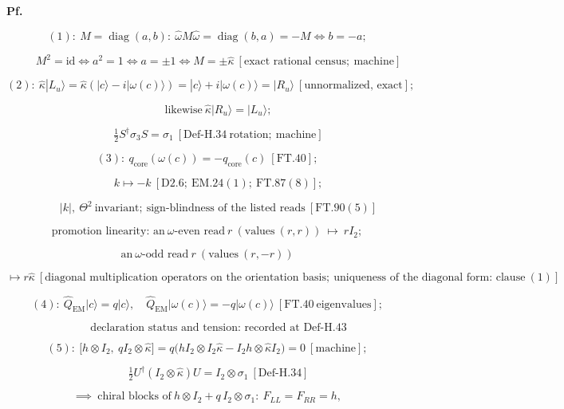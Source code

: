 \begin{theorem}
\textbf{Pf.}

\[
(1):\ M=\operatorname{diag}(a,b):\ \hat\omega M\hat\omega=\operatorname{diag}(b,a)=-M\iff b=-a;
\]

\[
\qquad M^2=\mathrm{id}\iff a^2=1\iff a=\pm1\iff M=\pm\hat\kappa\ [\text{exact rational census};\ \text{machine}]
\]

\[
(2):\ \hat\kappa|L_u\rangle=\hat\kappa(|c\rangle-i|\omega(c)\rangle)=|c\rangle+i|\omega(c)\rangle=|R_u\rangle\ [\text{unnormalized, exact}];
\]

\[
\qquad \text{likewise}\ \hat\kappa|R_u\rangle=|L_u\rangle;
\]

\[
\qquad \tfrac12S^\dagger\sigma_3S=\sigma_1\ [\mathrm{Def\text{-}H.34}\ \text{rotation};\ \text{machine}]
\]

\[
(3):\ q_{\mathrm{core}}(\omega(c))=-q_{\mathrm{core}}(c)\ [\mathrm{FT.40}];
\]

\[
\qquad k\mapsto-k\ [\mathrm{D2.6};\ \mathrm{EM.24}(1);\ \mathrm{FT.87}(8)];
\]

\[
\qquad |k|,\ \Theta^2\ \text{invariant};\ \text{sign-blindness of the listed reads}\ [\mathrm{FT.90}(5)]
\]

\[
\text{promotion linearity: an}\ \omega\text{-even read}\ r\ (\text{values}\ (r,r))\ \mapsto\ rI_2;
\]

\[
\ \text{an}\ \omega\text{-odd read}\ r\ (\text{values}\ (r,-r))\
\]

\[
\mapsto r\hat\kappa\ [\text{diagonal multiplication operators on the orientation basis};\ \text{uniqueness of the diagonal form: clause}\ (1)]
\]

\[
(4):\ \hat Q_{\mathrm{EM}}|c\rangle=q|c\rangle,\quad\hat Q_{\mathrm{EM}}|\omega(c)\rangle=-q|\omega(c)\rangle\ [\mathrm{FT.40}\ \text{eigenvalues}];
\]

\[
\qquad \text{declaration status and tension: recorded at Def-H.43}
\]

\[
(5):\ \bigl[h\otimes I_2,\ qI_2\otimes\hat\kappa\bigr]=q\bigl(hI_2\otimes I_2\hat\kappa-I_2h\otimes\hat\kappa I_2\bigr)=0\ [\text{machine}];
\]

\[
\qquad \tfrac12U^\dagger(I_2\otimes\hat\kappa)U=I_2\otimes\sigma_1\ [\mathrm{Def\text{-}H.34}]
\]

\[
\implies\ \text{chiral blocks of}\ h\otimes I_2+q\,I_2\otimes\sigma_1:\ F_{LL}=F_{RR}=h,
\]


\end{theorem}
